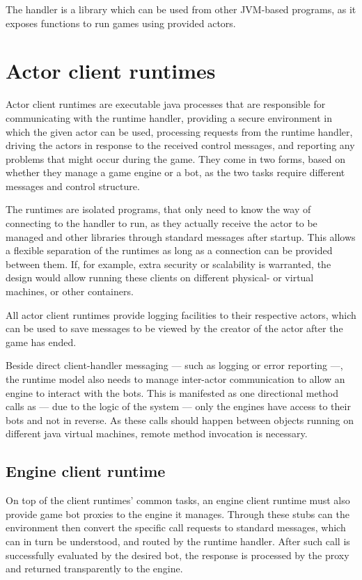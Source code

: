 	The handler is a library which can be used from other JVM-based programs, as it exposes functions to run games using provided actors.
	
	\section{Actor client runtimes}
	
	Actor client runtimes are executable java processes that are responsible for communicating with the runtime handler, providing a secure environment in which the given actor can be used, processing requests from the runtime handler, driving the actors in response to the received control messages, and reporting any problems that might occur during the game.
	They come in two forms, based on whether they manage a game engine or a bot, as the two tasks require different messages and control structure.

	 The runtimes are isolated programs, that only need to know the way of connecting to the handler to run, as they actually receive the actor to be managed and other libraries through standard messages after startup. This allows a flexible separation of the runtimes as long as a connection can be provided between them. If, for example, extra security or scalability is warranted, the design would allow running these clients on different physical- or virtual machines, or other containers.
	
	All actor client runtimes provide logging facilities to their respective actors, which can be used to save messages to be viewed by the creator of the actor after the game has ended.
	
	Beside direct client-handler messaging --- such as logging or error reporting ---, the runtime model also needs to manage inter-actor communication to allow an engine to interact with the bots. This is manifested as one directional method calls as --- due to the logic of the system --- only the engines have access to their bots and not in reverse.
	As these calls should happen between objects running on different java virtual machines, remote method invocation is necessary.
	
		\subsection*{Engine client runtime}
	
		On top of the client runtimes' common tasks, an engine client runtime must also provide game bot proxies to the engine it manages. Through these stubs can the environment then convert the specific call requests to standard messages, which can in turn be understood, and routed by the runtime handler. After such call is successfully evaluated by the desired bot, the response is processed by the proxy and returned transparently to the engine.
	
